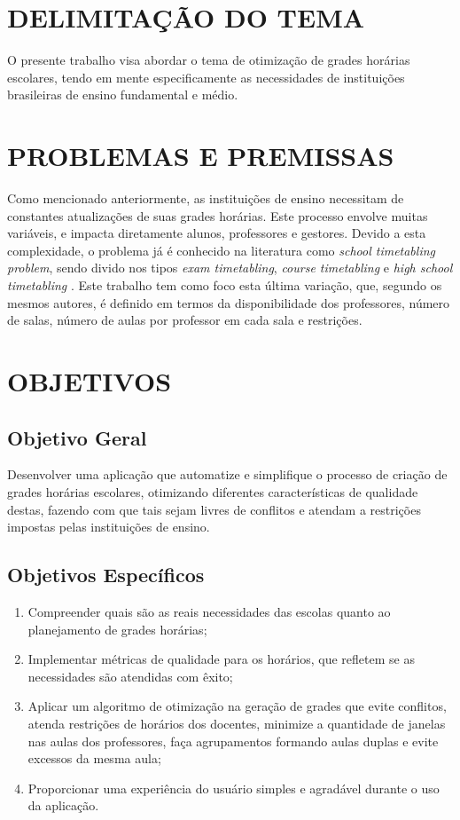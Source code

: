 \section{DELIMITAÇÃO DO TEMA}
\label{sec:antesleiame}

O presente trabalho visa abordar o tema de otimização de grades horárias escolares, tendo em mente especificamente as necessidades de instituições brasileiras de ensino fundamental e médio. 

\section{PROBLEMAS E PREMISSAS}
\label{sec:organizacaoTrabalho}

Como mencionado anteriormente, as instituições de ensino necessitam de constantes atualizações de suas grades horárias. Este processo envolve muitas variáveis, e impacta diretamente alunos, professores e gestores. Devido a esta complexidade, o problema já é conhecido na literatura como \textit{school timetabling problem}, sendo divido nos tipos \textit{exam timetabling}, \textit{course timetabling} e \textit{high school timetabling} \cite{TAN2021113943}. Este trabalho tem como foco esta última variação, que, segundo os mesmos autores, é definido em termos da disponibilidade dos professores, número de salas, número de aulas por professor em cada sala e restrições.

\section{OBJETIVOS}
\subsection{Objetivo Geral}

Desenvolver uma aplicação que automatize e simplifique o processo de criação de grades horárias escolares, otimizando diferentes características de qualidade destas, fazendo com que tais sejam livres de conflitos e atendam a restrições impostas pelas instituições de ensino.

\subsection{Objetivos Específicos}

\begin{enumerate}
	\item Compreender quais são as reais necessidades das escolas quanto ao planejamento de grades horárias;
	\item Implementar métricas de qualidade para os horários, que refletem se as necessidades são atendidas com êxito;
	\item Aplicar um algoritmo de otimização na geração de grades que evite conflitos, atenda restrições de horários dos docentes, minimize a quantidade de janelas nas aulas dos professores, faça agrupamentos formando aulas duplas e evite excessos da mesma aula;
	\item Proporcionar uma experiência do usuário simples e agradável durante o uso da aplicação.
\end{enumerate}

